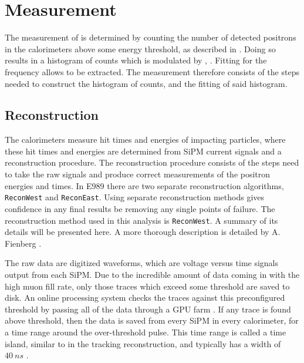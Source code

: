 
\thispagestyle{myheadings}

\graphicspath{{Body/Figures/RatioAnalysis/}{Body/Figures/RatioAnalysis/MethodOverview/}}

\chapter{\texorpdfstring{\wa}{wa} Measurement}
\label{chapter:SpinPrecessionMeasurement}


The measurement of \wa is determined by counting the number of detected positrons in the calorimeters above some energy threshold, as described in . Doing so results in a histogram of counts which is modulated by \wa, . Fitting for the frequency allows \wa to be extracted. The \wa measurement therefore consists of the steps needed to construct the histogram of counts, and the fitting of said histogram.


\section{Reconstruction}
\label{sec:ReconWest}


The calorimeters measure hit times and energies of impacting particles, where these hit times and energies are determined from SiPM current signals and a reconstruction procedure. The reconstruction procedure consists of the steps need to take the raw signals and produce correct measurements of the positron energies and times. In E989 there are two separate reconstruction algorithms, \texttt{ReconWest} and \texttt{ReconEast}. Using separate reconstruction methods gives confidence in any final results be removing any single points of failure. The reconstruction method used in this analysis is \texttt{ReconWest}. A summary of its details will be presented here. A more thorough description is detailed by A. Fienberg \cite{AFThesis}.


The raw data are digitized waveforms, which are voltage versus time signals output from each SiPM. Due to the incredible amount of data coming in with the high muon fill rate, only those traces which exceed some threshold are saved to disk. An online processing system checks the traces against this preconfigured threshold by passing all of the data through a GPU farm \cite{Gohn:2016shi}. If any trace is found above threshold, then the data is saved from every SiPM in every calorimeter, for a time range around the over-threshold pulse. This time range is called a time island, similar to in the tracking reconstruction, and typically has a width of $\SI{40}{ns}$ \cite{AFThesis}.







